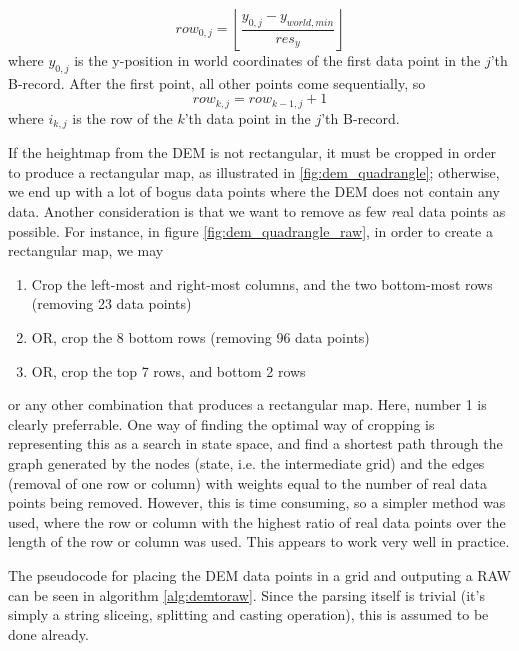 $$
row_{0,j} = \left\lfloor \frac{y_{0,j}-y_{world,min}}{res_y}\right\rfloor
$$
where $y_{0,j}$ is the y-position in world coordinates of the first data point in the $j$'th B-record. After the first point, all other points come sequentially, so
$$
row_{k,j} = row_{k-1,j} + 1
$$
where $i_{k,j}$ is the row of the $k$'th data point in the $j$'th B-record. 

If the heightmap from the DEM is not rectangular, it must be cropped in order to produce a rectangular map, as illustrated in \ref{fig:dem_quadrangle}; otherwise, we end up with a lot of bogus data points where the DEM does not contain any data. Another consideration is that we want to remove as few {\textit real} data points as possible. For instance, in figure \ref{fig:dem_quadrangle_raw}, in order to create a rectangular map, we may
\begin{enumerate}
\item Crop the left-most and right-most columns, and the two bottom-most rows (removing 23 data points)
\item OR, crop the 8 bottom rows (removing 96 data points)
\item OR, crop the top 7 rows, and bottom 2 rows
\end{enumerate}
or any other combination that produces a rectangular map. Here, number 1 is clearly preferrable. One way of finding the optimal way of cropping is representing this as a search in state space, and find a shortest path through the graph generated by the nodes (state, i.e. the intermediate grid) and the edges (removal of one row or column) with weights equal to the number of real data points being removed. However, this is time consuming, so a simpler method was used, where the row or column with the highest ratio of real data points over the length of the row or column was used. This appears to work very well in practice.

The pseudocode for placing the DEM data points in a grid and outputing a RAW can be seen in algorithm \ref{alg:demtoraw}. Since the parsing itself is trivial (it's simply a string sliceing, splitting and casting operation), this is assumed to be done already.

